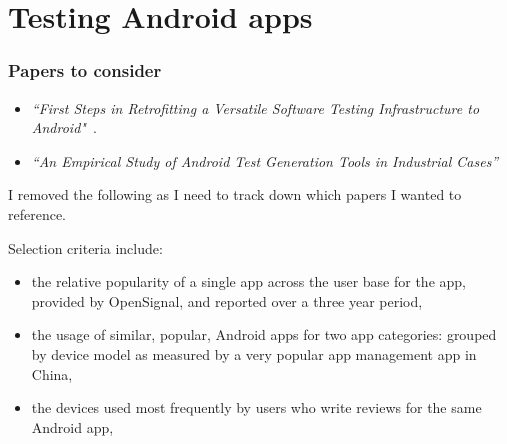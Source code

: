 \section{Testing Android apps}
\subsubsection{Papers to consider}
\begin{itemize}

    \item \emph{``First Steps in Retrofitting a Versatile Software Testing Infrastructure to Android"}~\cite{oliver2018_first_steps_in_retrofitting_a_versatile_sw_testing_architecture}.
    
       
    \item \emph{``An Empirical Study of Android Test Generation Tools in Industrial Cases''}~\cite{wang2018_an_empirical_study_of_android_test_generation_tools_in_industrial_cases} 

\end{itemize}

I removed the following as I need to track down which papers I wanted to reference.

Selection criteria include:
\begin{itemize}
    \item the relative popularity of a single app across the user base for the app, provided by OpenSignal, and reported over a three year period,
    \item the usage of similar, popular, Android apps for two app categories: grouped by device model as measured by a very popular app management app in China,
    \item the devices used most frequently by users who write reviews for the same Android app,
\end{itemize}


